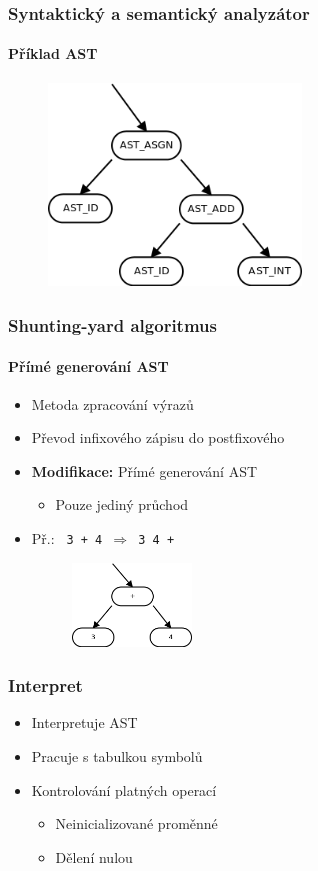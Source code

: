 \documentclass[12pt]{beamer}
\begin{document}
\begin{frame}
	\frametitle{Syntaktický a semantický analyzátor}
	\framesubtitle{Příklad AST}
	\begin{figure}
		\centering
			\includegraphics[width=0.6\textwidth]{ast.png}
	\end{figure}	
\end{frame}

\begin{frame}
	\frametitle{Shunting-yard algoritmus}
	\framesubtitle{Přímé generování AST}
	\begin{itemize}
		\item Metoda zpracování výrazů
		\item Převod infixového zápisu do postfixového
		\item \textbf{Modifikace:} Přímé generování AST
		\begin{itemize}
			\item Pouze jediný průchod
		\end{itemize}
		\item Př.: \texttt{ 3 + 4 $\Rightarrow$ 3 4 + }
		\begin{figure}
			\centering
				\includegraphics[width=0.3\textwidth]{sya.png}
		\end{figure}
	\end{itemize}
\end{frame}

\begin{frame}
	\frametitle{Interpret}
	\begin{itemize}
		\item Interpretuje AST
		\item Pracuje s tabulkou symbolů
		\item Kontrolování platných operací
		\begin{itemize}
			\item Neinicializované proměnné
			\item Dělení nulou
		\end{itemize}
	\end{itemize}
\end{frame}
\end{document}
